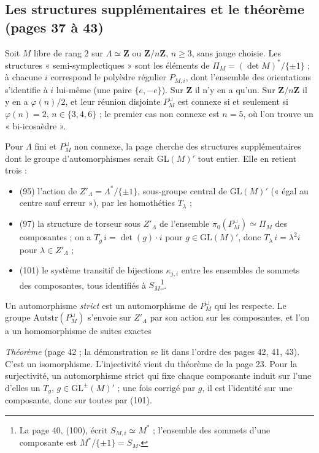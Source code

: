 \documentclass[11pt,a4paper]{article}
\begin{document}
\subsection*{Les structures supplémentaires et le théorème (pages 37 à 43)}

Soit $M$ libre de rang $2$ sur $\Lambda \simeq \mathbf{Z}$ ou
$\mathbf{Z}/n\mathbf{Z}$, $n \geq 3$, sans jauge choisie. Les structures
« semi-symplectiques » sont les éléments de $\Pi_M = (\det M)^{*}/\{\pm 1\}$ ;
à chacune $i$ correspond le polyèdre régulier $P_{M,i}$, dont l'ensemble des
orientations s'identifie à $i$ lui-même (une paire $\{e, -e\}$). Sur
$\mathbf{Z}$ il n'y en a qu'un. Sur $\mathbf{Z}/n\mathbf{Z}$ il y en a
$\varphi(n)/2$, et leur réunion disjointe $P_M^{\sqcup}$ est connexe si et
seulement si $\varphi(n) = 2$, $n \in \{3, 4, 6\}$ ; le premier cas non connexe
est $n = 5$, où l'on trouve un « bi-icosaèdre ».

Pour $\Lambda$ fini et $P_M^{\sqcup}$ non connexe, la page cherche des
structures supplémentaires dont le groupe d'automorphismes serait
$\mathrm{GL}(M)'$ tout entier. Elle en retient trois :
\begin{itemize}
  \item (95) l'action de $Z'_\Lambda = \Lambda^{*}/\{\pm 1\}$, sous-groupe
    central de $\mathrm{GL}(M)'$ (« égal au centre sauf erreur »), par les
    homothéties $T_\lambda$ ;
  \item (97) la structure de torseur sous $Z'_\Lambda$ de l'ensemble
    $\pi_0(P_M^{\sqcup}) \simeq \Pi_M$ des composantes ; on a $T_g\, i =
    \det(g) \cdot i$ pour $g \in \mathrm{GL}(M)'$, donc $T_\lambda\, i =
    \lambda^2 i$ pour $\lambda \in Z'_\Lambda$ ;
  \item (101) le système transitif de bijections $\kappa_{j,i}$ entre les
    ensembles de sommets des composantes, tous identifiés à $S_M$\footnote{La
    page 40, (100), écrit $S_{M,i} \simeq M^{*}$ ; l'ensemble des sommets
    d'une composante est $M^{*}/\{\pm 1\} = S_M$.}.
\end{itemize}
Un automorphisme \emph{strict} est un automorphisme de $P_M^{\sqcup}$ qui les
respecte. Le groupe $\mathrm{Autstr}(P_M^{\sqcup})$ s'envoie sur $Z'_\Lambda$
par son action sur les composantes, et l'on a un homomorphisme de suites
exactes
\emph{Théorème} (page 42 ; la démonstration se lit dans l'ordre des pages 42,
41, 43). C'est un isomorphisme. L'injectivité vient du théorème de la page
23. Pour la surjectivité, un automorphisme strict qui fixe chaque composante
induit sur l'une d'elles un $T_g$, $g \in \mathrm{GL}^{\pm}(M)'$ ; une fois
corrigé par $g$, il est l'identité sur une composante, donc sur toutes par
(101).
\end{document}
